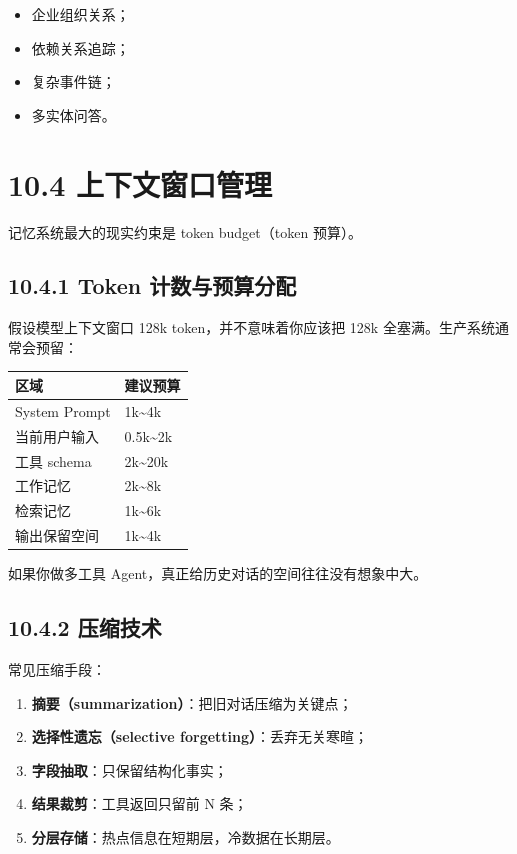 \begin{itemize}[leftmargin=2em]
\item 企业组织关系；
\item 依赖关系追踪；
\item 复杂事件链；
\item 多实体问答。
\end{itemize}

\section{10.4 上下文窗口管理}

记忆系统最大的现实约束是 token budget（token 预算）。


\subsection{10.4.1 Token 计数与预算分配}

假设模型上下文窗口 128k token，并不意味着你应该把 128k 全塞满。生产系统通常会预留：


\begingroup
\scriptsize
\setlength{\tabcolsep}{3pt}
\begin{longtable}{|p{}|p{}|}
\hline
区域 & 建议预算 \\ \hline
System Prompt & 1k\textasciitilde{}4k \\ \hline
当前用户输入 & 0.5k\textasciitilde{}2k \\ \hline
工具 schema & 2k\textasciitilde{}20k \\ \hline
工作记忆 & 2k\textasciitilde{}8k \\ \hline
检索记忆 & 1k\textasciitilde{}6k \\ \hline
输出保留空间 & 1k\textasciitilde{}4k \\ \hline
\end{longtable}
\endgroup

如果你做多工具 Agent，真正给历史对话的空间往往没有想象中大。


\subsection{10.4.2 压缩技术}

常见压缩手段：


\begin{enumerate}[leftmargin=2em]
\item \textbf{摘要（summarization）}：把旧对话压缩为关键点；
\item \textbf{选择性遗忘（selective forgetting）}：丢弃无关寒暄；
\item \textbf{字段抽取}：只保留结构化事实；
\item \textbf{结果裁剪}：工具返回只留前 N 条；
\item \textbf{分层存储}：热点信息在短期层，冷数据在长期层。
\end{enumerate}

